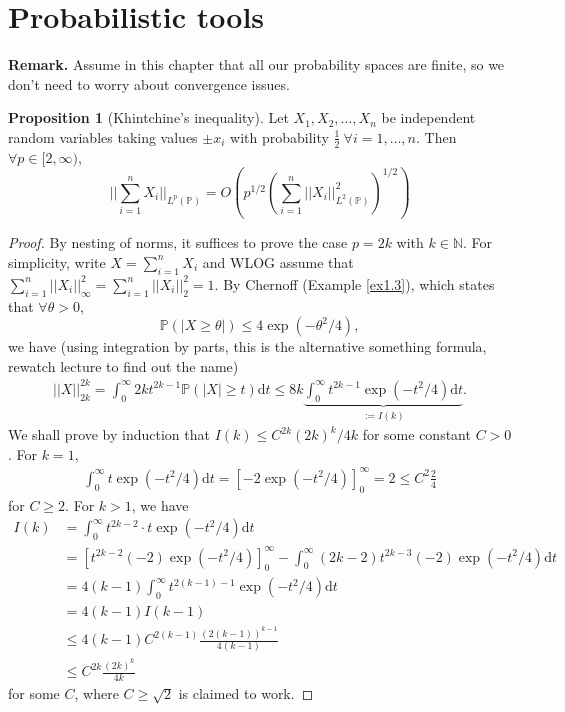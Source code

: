 \documentclass{article}
\theoremstyle{definition}
\newtheorem{prop}[theorem]{Proposition}
\begin{document}
\section{Probabilistic tools}
\textbf{Remark.} Assume in this chapter that all our probability spaces are finite, so we don't need to worry about convergence issues.
\begin{prop}[Khintchine's inequality]\label{prop3.1}
    Let $X_1,X_2,\ldots,X_n$ be independent random variables taking values $\pm x_i$ with probability $\frac{1}{2} ~\forall i=1,\ldots,n$. Then $\forall p \in [2,\infty)$, \[
    ||\sum_{i=1}^{n} X_i ||_{L^p(\mathbb{P})} = O \left(p^{1/2}\left(\sum_{i=1}^{n} ||X_i||_{L^2(\mathbb{P})}^2\right)^{1/2}\right)
    \]
\end{prop}
\begin{proof}
    
    By nesting of norms, it suffices to prove the case $p = 2k$ with $k \in \mathbb{N}$. For simplicity, write $X = \sum_{i=1}^{n} X_i$ and WLOG assume that $\sum_{i=1}^{n} ||X_i||_{\infty}^2 = \sum_{i=1}^{n} ||X_i||_2^2 = 1$. By Chernoff (Example \ref{ex1.3}), which states that $\forall \theta >0$, \[
    \mathbb{P}\left(\left|X\ge \theta\right|\right) \le 4 \exp(-\theta^2/4),
    \]
    we have (using integration by parts, this is the alternative something formula, rewatch lecture to find out the name)
    \begin{align*}
        ||X||_{2k}^{2k} = \int_{0}^{\infty} 2k t^{2k-1}\mathbb{P}\left(\left|X\right|\ge t\right)\mathrm{d}t \le 8k \underbrace{\int_{0}^{\infty} t^{2k-1}\exp(-t^2/4)\mathrm{d}t}_{:=I(k)}.
    \end{align*}
    We shall prove by induction that $I(k) \le C^{2k}(2k)^k/4k$ for some constant $C>0$. For $k=1$, 
    \begin{align*}
        \int_{0}^{\infty} t \exp \left(-t^2/4\right) \mathrm{d}t = [-2\exp \left(-t^2/4\right)]_0^{\infty} = 2 \le C^2\frac{2}{4} 
    \end{align*}
    for $C \ge 2$. For $k>1$, we have 
    \begin{align*}
        I(k) &= \int_{0}^{\infty}  t^{2k-2} \cdot t \exp \left(-t^2/4\right) \mathrm{d}t \\
        &= [t^{2k-2}(-2)\exp \left(-t^2/4\right)]_0^\infty - \int_{0}^{\infty} (2k-2)t^{2k-3}(-2)\exp \left(-t^2/4 \right)\mathrm{d}t \\
        &= 4(k-1)\int_{0}^{\infty} t^{2(k-1)-1} \exp(-t^2/4)\mathrm{d}t \\
        &= 4(k-1)I(k-1) \\
        &\le 4(k-1) C^{2(k-1)}\frac{(2(k-1))^{k-1}}{4(k-1)} \\
        &\le C^{2k}\frac{(2k)^k}{4k}
    \end{align*}
    for some $C$, where $C\ge \sqrt{2}$ is claimed to work.
\end{proof}
\end{document}
